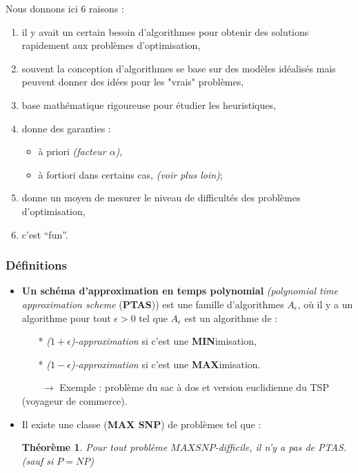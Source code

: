 \documentclass{article}
\newtheorem{thm}{Th\'eor\`eme}[section]
\begin{document}
\begin{sffamily}
Nous donnons ici 6 raisons :
\begin{enumerate}
\item il y avait un certain besoin d'algorithmes pour obtenir des solutions rapidement aux problèmes d'optimisation,
\item souvent la conception d'algorithmes se base sur des modèles idéalisés mais peuvent donner des idées pour les "vrais" problèmes,
\item base mathématique rigoureuse pour étudier les heuristiques,
\newpage
\item donne des garanties :
\begin{itemize}
\item à priori \textit{(facteur $\alpha$)},
\item à fortiori dans certains cas, \textit{(voir plus loin)};
\end{itemize}
\item donne un moyen de mesurer le niveau de difficultés des problèmes d'optimisation,
\item c'est ``fun''.
\end{enumerate}

\subsubsection{Définitions}

\begin{itemize}
\item \textbf{Un schéma d'approximation en temps polynomial} \textit{(polynomial time approximation scheme} (\textbf{PTAS})) est une 
famille d'algorithmes $A_\epsilon$, où il y a un algorithme pour tout $\epsilon > 0$ tel que $A_\epsilon$ est un algorithme de :
\begin{itemize}
\item[*] \textit{($1+\epsilon$)-approximation} si c'est une \textbf{MIN}imisation,
\item[*] \textit{($1-\epsilon$)-approximation} si c'est une \textbf{MAX}imisation.
\end{itemize}
$\qquad \rightarrow$ Exemple : problème du sac à dos et version euclidienne du TSP (voyageur de commerce).
  
\item Il existe une classe (\textbf{MAX SNP}) de problèmes tel que :
\begin{thm} Pour tout problème \textit{$MAX SNP$-difficile}, il n'y a pas de PTAS. (sauf si $P = NP$)
\end{thm}


\end{itemize}
\end{sffamily}
\end{document}
